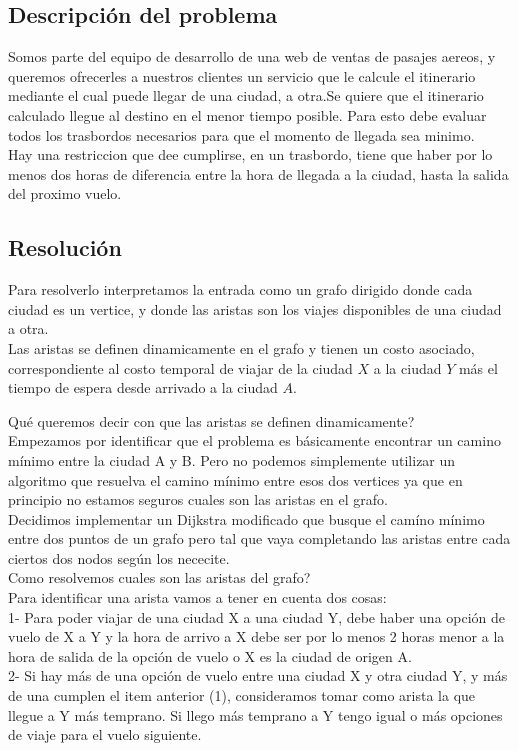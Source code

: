 \subsection{Descripci\'on del problema}

\noindent
Somos parte del equipo de desarrollo de una web de ventas de pasajes aereos, y queremos ofrecerles a nuestros clientes un servicio que le calcule el itinerario mediante el cual puede llegar de una ciudad, a otra.Se quiere que el itinerario calculado llegue al destino en el menor tiempo posible. Para esto debe evaluar todos los trasbordos necesarios para que el momento de llegada sea minimo. \\
Hay una restriccion que dee cumplirse, en un trasbordo, tiene que haber por lo menos dos horas de diferencia entre la hora de llegada a la ciudad, hasta la salida del proximo vuelo. \\

\subsection{Resoluci\'on}

\noindent
Para resolverlo interpretamos la entrada como un grafo dirigido donde cada ciudad es un vertice, y donde las aristas son los viajes disponibles de una ciudad a otra. \\
Las aristas se definen dinamicamente en el grafo y tienen un costo asociado, correspondiente al costo temporal de viajar de la ciudad $X$ a la ciudad $Y$ m\'as el tiempo de espera desde arrivado a la ciudad $A$.

\noindent
Qu\'e queremos decir con que las aristas se definen dinamicamente?  \\
Empezamos por identificar que el problema es b\'asicamente encontrar un camino m\'inimo entre la ciudad A y B. Pero no podemos simplemente utilizar un algoritmo que resuelva el camino m\'inimo entre esos dos vertices ya que en principio no estamos seguros cuales son las aristas en el grafo. \\

\noindent
Decidimos implementar un Dijkstra modificado que busque el cam\'ino m\'inimo entre dos puntos de un grafo pero tal que vaya completando las aristas entre cada ciertos dos nodos seg\'un los nececite. \\

\noindent
Como resolvemos cuales son las aristas del grafo? \\
Para identificar una arista vamos a tener en cuenta dos cosas: \\
1- Para poder viajar de una ciudad X a una ciudad Y, debe haber una opci\'on de vuelo de X a Y y la hora de arrivo a X debe ser por lo menos 2 horas menor a la hora de salida de la opci\'on de vuelo o X es la ciudad de origen A.\\
2- Si hay m\'as de una opci\'on de vuelo entre una ciudad X y otra ciudad Y, y m\'as de una cumplen el item anterior (1), consideramos tomar como arista la que llegue a Y m\'as temprano. Si llego m\'as temprano a Y tengo igual o m\'as opciones de viaje para el vuelo siguiente. \\

